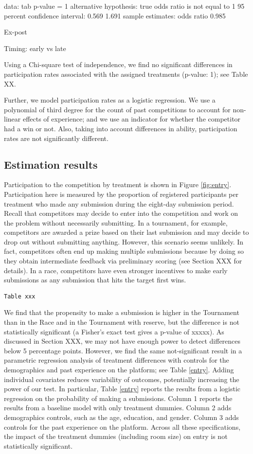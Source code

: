 \documentclass[12pt,]{article}
\begin{document}
data: tab p-value = 1 alternative hypothesis: true odds ratio is not
equal to 1 95 percent confidence interval: 0.569 1.691 sample estimates:
odds ratio 0.985

Ex-post

Timing: early vs late

Using a Chi-square test of independence, we find no significant
differences in participation rates associated with the assigned
treatments (p-value: 1); see Table XX.

Further, we model participation rates as a logistic regression. We use a
polynomial of third degree for the count of past competitions to account
for non-linear effects of experience; and we use an indicator for
whether the competitor had a win or not. Also, taking into account
differences in ability, participation rates are not significantly
different.

\subsection{Estimation results}\label{estimation-results}

Participation to the competition by treatment is shown in Figure
\ref{fig:entry}. Participation here is measured by the proportion of
registered participants per treatment who made any submission during the
eight-day submission period. Recall that competitors may decide to enter
into the competition and work on the problem without necessarily
submitting. In a tournament, for example, competitors are awarded a
prize based on their last submission and may decide to drop out without
submitting anything. However, this scenario seems unlikely. In fact,
competitors often end up making multiple submissions because by doing so
they obtain intermediate feedback via preliminary scoring (see Section
XXX for details). In a race, competitors have even stronger incentives
to make early submissions as any submission that hits the target first
wins.

\begin{verbatim}
Table xxx
\end{verbatim}

We find that the propensity to make a submission is higher in the
Tournament than in the Race and in the Tournament with reserve, but the
difference is not statistically significant (a Fisher's exact test gives
a p-value of xxxxx). As discussed in Section XXX, we may not have enough
power to detect differences below 5 percentage points. However, we find
the same not-significant result in a parametric regression analysis of
treatment differences with controls for the demographics and past
experience on the platform; see Table \ref{entry}. Adding individual
covariates reduces variability of outcomes, potentially increasing the
power of our test. In particular, Table \ref{entry} reports the results
from a logistic regression on the probability of making a submissions.
Column 1 reports the results from a baseline model with only treatment
dummies. Column 2 adds demographics controls, such as the age,
education, and gender. Column 3 adds controls for the past experience on
the platform. Across all these specifications, the impact of the
treatment dummies (including room size) on entry is not statistically
significant.
\end{document}
